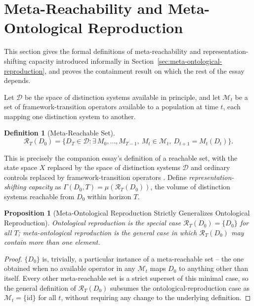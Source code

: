 \documentclass[11pt]{article}
\theoremstyle{plain}
\newtheorem{definition}{Definition}[section]
\newtheorem{proposition}{Proposition}[section]
\begin{document}
\section{Meta-Reachability and Meta-Ontological Reproduction}
\label{app:meta-reachability}

\noindent This section gives the formal definitions of meta-reachability and representation-shifting capacity introduced informally in Section~\ref{sec:meta-ontological-reproduction}, and proves the containment result on which the rest of the essay depends.

Let $\mathcal{D}$ be the space of distinction systems available in principle, and let $\mathcal{M}_t$ be a set of framework-transition operators available to a population at time $t$, each mapping one distinction system to another.

\begin{definition}[Meta-Reachable Set]
\[
\mathcal{R}_T(D_0) = \big\{ D_T \in \mathcal{D} : \exists\, M_0,\ldots,M_{T-1},\ M_t \in \mathcal{M}_t,\ D_{t+1} = M_t(D_t) \big\}.
\]
\end{definition}

\noindent This is precisely the companion essay's definition of a reachable set, with the state space $X$ replaced by the space of distinction systems $\mathcal{D}$ and ordinary controls replaced by framework-transition operators \cite{flyxion2026cone}. Define \emph{representation-shifting capacity} as $\Gamma(D_0,T) = \mu(\mathcal{R}_T(D_0))$, the volume of distinction systems reachable from $D_0$ within horizon $T$.

\begin{proposition}[Meta-Ontological Reproduction Strictly Generalizes Ontological Reproduction]
Ontological reproduction is the special case $\mathcal{R}_T(D_0) = \{D_0\}$ for all $T$; meta-ontological reproduction is the general case in which $\mathcal{R}_T(D_0)$ may contain more than one element.
\end{proposition}
\begin{proof}
$\{D_0\}$ is, trivially, a particular instance of a meta-reachable set -- the one obtained when no available operator in any $\mathcal{M}_t$ maps $D_0$ to anything other than itself. Every other meta-reachable set is a strict superset of this minimal case, so the general definition of $\mathcal{R}_T(D_0)$ subsumes the ontological-reproduction case as $\mathcal{M}_t = \{\mathrm{id}\}$ for all $t$, without requiring any change to the underlying definition.
\end{proof}
\end{document}

